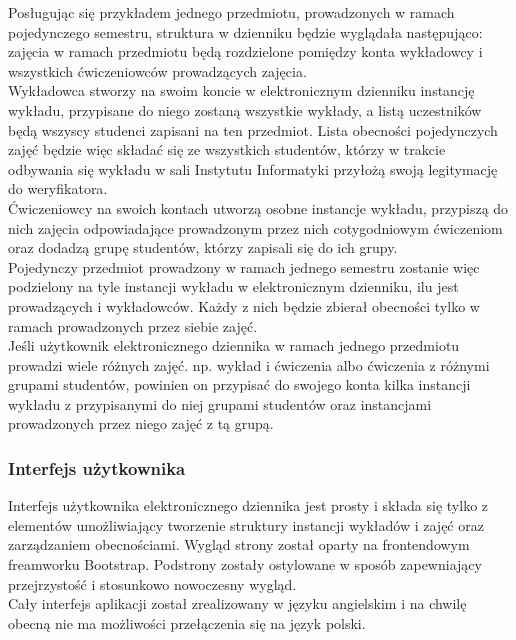 \documentclass[declaration,shortabstract, mgr]{iithesis}
\begin{document}
\indent Posługując się przykładem jednego przedmiotu, prowadzonych w ramach pojedynczego semestru, struktura w dzienniku będzie wyglądała następująco: zajęcia w ramach przedmiotu będą rozdzielone pomiędzy konta wykładowcy i wszystkich ćwiczeniowców prowadzących zajęcia. \\
\indent Wykładowca stworzy na swoim koncie w elektronicznym dzienniku instancję wykładu, przypisane do niego zostaną wszystkie wykłady, a listą uczestników będą wszyscy studenci zapisani na ten przedmiot. Lista obecności pojedynczych zajęć będzie więc składać się ze wszystkich studentów, którzy w trakcie odbywania się wykładu w sali Instytutu Informatyki przyłożą swoją legitymację do weryfikatora.\\
\indent Ćwiczeniowcy na swoich kontach utworzą osobne instancje wykładu, przypiszą do nich zajęcia odpowiadające prowadzonym przez nich cotygodniowym ćwiczeniom oraz dodadzą grupę studentów, którzy zapisali się do ich grupy. \\
\indent Pojedynczy przedmiot prowadzony w ramach jednego semestru zostanie więc podzielony na tyle instancji wykładu w elektronicznym dzienniku, ilu jest prowadzących i wykładowców. Każdy z nich będzie zbierał obecności tylko w ramach prowadzonych przez siebie zajęć. \\
\indent Jeśli użytkownik elektronicznego dziennika w ramach jednego przedmiotu prowadzi wiele różnych zajęć. np. wykład i ćwiczenia albo ćwiczenia z różnymi grupami studentów, powinien on przypisać do swojego konta kilka instancji wykładu z przypisanymi do niej grupami studentów oraz instancjami prowadzonych przez niego zajęć z tą grupą.

\subsubsection{Interfejs użytkownika}
\indent Interfejs użytkownika elektronicznego dziennika jest prosty i składa się tylko z elementów umożliwiający tworzenie struktury instancji wykładów i zajęć oraz zarządzaniem obecnościami. Wygląd strony został oparty na frontendowym freamworku Bootstrap\cite{bootstrap}. 
Podstrony zostały ostylowane w sposób zapewniający przejrzystość i stosunkowo nowoczesny wygląd. \\
\indent Cały interfejs aplikacji został zrealizowany w języku angielskim i na chwilę obecną nie ma możliwości przełączenia się na język polski.\\
\end{document}
